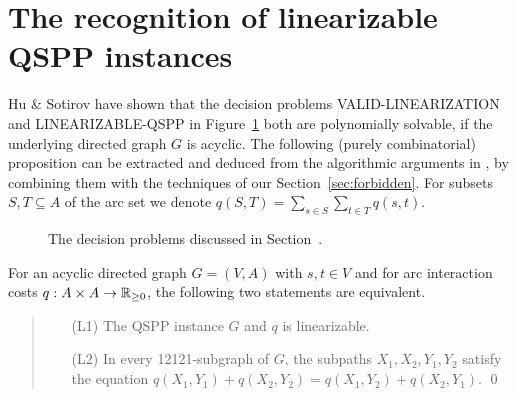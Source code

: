 \documentclass[runningheads]{llncs}
\begin{document}
\section{The recognition of linearizable QSPP instances}
\label{sec:hardness}
Hu \& Sotirov \cite{HuSo2018b} have shown that the decision problems VALID-LI\-NEARI\-ZA\-TION
and LI\-NEA\-RIZABLE-QSPP in Figure~\ref{fig:problems} both are polynomially solvable, 
if the underlying directed graph $G$ is acyclic.
The following (purely combinatorial) proposition can be extracted and deduced from the algorithmic
arguments in \cite{HuSo2018b}, by combining them with the techniques of our Section~\ref{sec:forbidden}.
For subsets $S,T\subseteq A$ of the arc set we denote $q(S,T)=\sum_{s\in S}\sum_{t\in T}q(s,t)$.

\begin{figure}[tb]
\begin{center}

\medskip
\end{center}
\caption{The decision problems discussed in Section~\protect{\ref{sec:hardness}}.}
\label{fig:problems}
\end{figure}

\begin{proposition}
\label{pr:HS}
For an acyclic directed graph $G=(V,A)$ with $s,t\in V$ and for arc interaction
costs $q:A\times A\to{\mathbb{R}_{\ge0}}$, the following two statements are equivalent.
\begin{quote}
\begin{itemize}
\item[(L1)] The QSPP instance $G$ and $q$ is linearizable.
\item[(L2)] In every 12121-subgraph of $G$, the subpaths $X_1,X_2,Y_1,Y_2$ satisfy the equation
$q(X_1,Y_1)+q(X_2,Y_2) = q(X_1,Y_2)+q(X_2,Y_1)$. \qed
\end{itemize}
\end{quote}
\end{proposition}
\end{document}

